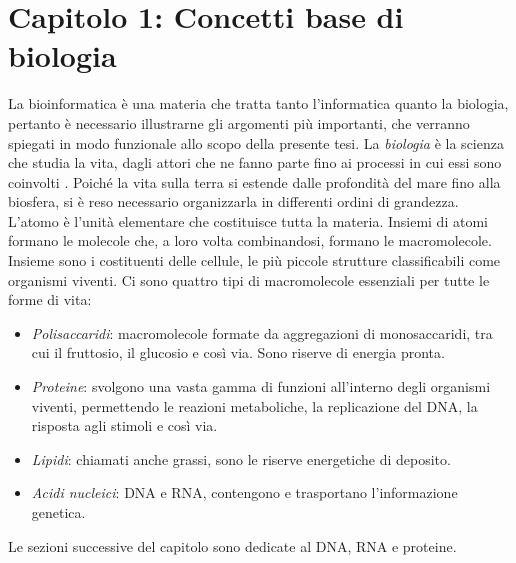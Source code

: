 \chapter{Capitolo 1: Concetti base di biologia}
La bioinformatica è una materia che tratta tanto l'informatica quanto la biologia, pertanto è necessario illustrarne gli argomenti più importanti, che verranno spiegati in modo funzionale allo scopo della presente tesi.
\newline
La \textit{biologia} è la scienza che studia la vita, dagli attori che ne fanno parte fino ai processi in cui essi sono coinvolti \cite{campbellBiology}. Poiché la vita sulla terra si estende dalle profondità del mare fino alla biosfera, si è reso necessario organizzarla in differenti ordini di grandezza. L'atomo è l'unità elementare che costituisce tutta la materia. Insiemi di atomi formano le molecole che, a loro volta combinandosi, formano le macromolecole. Insieme sono i costituenti delle cellule, le più piccole strutture classificabili come organismi viventi.
\newline
Ci sono quattro tipi di macromolecole essenziali per tutte le forme di vita:
\begin{itemize}
	\item \textit{Polisaccaridi}: macromolecole formate da aggregazioni di monosaccaridi, tra cui il fruttosio, il glucosio e così via. Sono riserve di energia pronta.
	\item \textit{Proteine}: svolgono una vasta gamma di funzioni all'interno degli organismi viventi, permettendo le reazioni metaboliche, la replicazione del DNA, la risposta agli stimoli e così via.
	\item \textit{Lipidi}: chiamati anche grassi, sono le riserve energetiche di deposito.
	\item \textit{Acidi nucleici}: DNA e RNA, contengono e trasportano l'informazione genetica.
\end{itemize}
Le sezioni successive del capitolo sono dedicate al DNA, RNA e proteine.
\newpage


